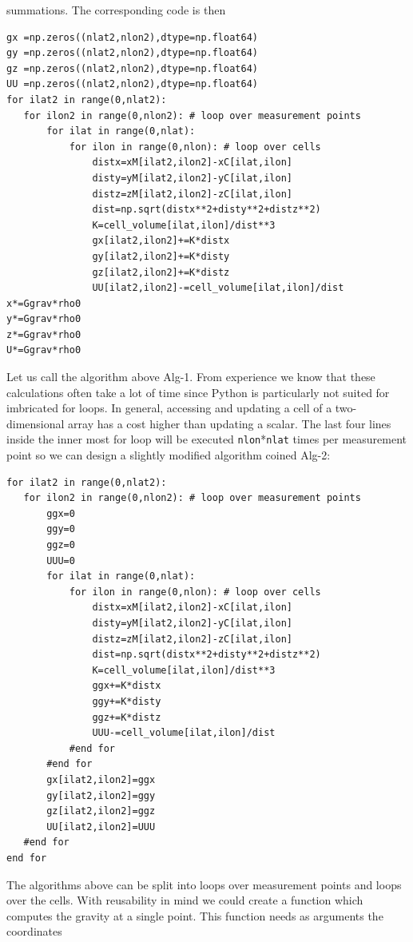 summations.
The corresponding code is then 
\begin{lstlisting}
gx =np.zeros((nlat2,nlon2),dtype=np.float64)
gy =np.zeros((nlat2,nlon2),dtype=np.float64)
gz =np.zeros((nlat2,nlon2),dtype=np.float64)
UU =np.zeros((nlat2,nlon2),dtype=np.float64)
for ilat2 in range(0,nlat2):
   for ilon2 in range(0,nlon2): # loop over measurement points
       for ilat in range(0,nlat):
           for ilon in range(0,nlon): # loop over cells
               distx=xM[ilat2,ilon2]-xC[ilat,ilon]
               disty=yM[ilat2,ilon2]-yC[ilat,ilon]
               distz=zM[ilat2,ilon2]-zC[ilat,ilon]
               dist=np.sqrt(distx**2+disty**2+distz**2)
               K=cell_volume[ilat,ilon]/dist**3
               gx[ilat2,ilon2]+=K*distx
               gy[ilat2,ilon2]+=K*disty
               gz[ilat2,ilon2]+=K*distz
               UU[ilat2,ilon2]-=cell_volume[ilat,ilon]/dist
x*=Ggrav*rho0
y*=Ggrav*rho0
z*=Ggrav*rho0
U*=Ggrav*rho0
\end{lstlisting}
Let us call the algorithm above Alg-1.
From experience we know that these calculations often take a lot of time since 
Python is particularly not suited for imbricated for loops. 
In general, accessing and updating a cell of a two-dimensional array has a cost
higher than updating a scalar. The last four lines inside the inner most for loop 
will be executed \lstinline{nlon}*\lstinline{nlat} times per measurement point
so we can design a slightly modified algorithm coined Alg-2:
\begin{lstlisting}
for ilat2 in range(0,nlat2):
   for ilon2 in range(0,nlon2): # loop over measurement points
       ggx=0
       ggy=0
       ggz=0
       UUU=0
       for ilat in range(0,nlat):
           for ilon in range(0,nlon): # loop over cells
               distx=xM[ilat2,ilon2]-xC[ilat,ilon]
               disty=yM[ilat2,ilon2]-yC[ilat,ilon]
               distz=zM[ilat2,ilon2]-zC[ilat,ilon]
               dist=np.sqrt(distx**2+disty**2+distz**2)
               K=cell_volume[ilat,ilon]/dist**3
               ggx+=K*distx
               ggy+=K*disty
               ggz+=K*distz
               UUU-=cell_volume[ilat,ilon]/dist
           #end for
       #end for
       gx[ilat2,ilon2]=ggx
       gy[ilat2,ilon2]=ggy
       gz[ilat2,ilon2]=ggz
       UU[ilat2,ilon2]=UUU
   #end for
end for
\end{lstlisting}
The algorithms above can be split into loops over measurement points 
and loops over the cells. With reusability in mind we could create a function which 
computes the gravity at a single point. This function needs as arguments the coordinates
